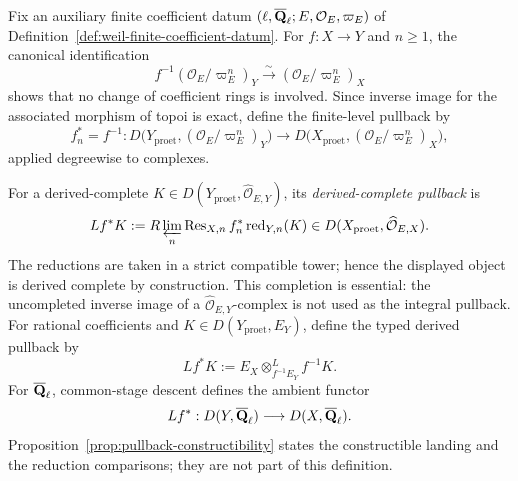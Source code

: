 \begin{definition}
\label{def:derived-pullback}


Fix an auxiliary finite coefficient datum
\((\ell,\overline{\mathbf Q}_\ell;E,\mathcal O_E,\varpi_E)\) of
Definition~\ref{def:weil-finite-coefficient-datum}.
For \(f:X\to Y\) and \(n\geq1\), the canonical identification
\[
 f^{-1}(\mathcal O_E/\varpi_E^n)_Y
 \xrightarrow{\sim}(\mathcal O_E/\varpi_E^n)_X
\]
shows that no change of coefficient rings is involved.  Since inverse image
for the associated morphism of topoi is exact, define the finite-level
pullback by
\[
 f_n^*=f^{-1}:
 D\bigl(Y_{\mathrm{proet}},(\mathcal O_E/\varpi_E^n)_Y\bigr)
 \longrightarrow
 D\bigl(X_{\mathrm{proet}},(\mathcal O_E/\varpi_E^n)_X\bigr),
\]
applied degreewise to complexes.

For a derived-complete
\(K\in D(Y_{\mathrm{proet}},\widehat{\mathcal O}_{E,Y})\), its
\emph{derived-complete pullback} is
\[
 Lf^*K:=R\varprojlim_n\operatorname{Res}_{X,n}
 f_n^*\operatorname{red}_{Y,n}(K)
 \in D(X_{\mathrm{proet}},\widehat{\mathcal O}_{E,X}).
\]
The reductions are taken in a strict compatible tower; hence the displayed
object is derived complete by construction.  This completion is essential:
the uncompleted inverse image of a
\(\widehat{\mathcal O}_{E,Y}\)-complex is not used as the integral
pullback.  For rational coefficients and
\(K\in D(Y_{\mathrm{proet}},E_Y)\), define the typed derived pullback by
\[
 Lf^*K:=E_X\otimes^L_{f^{-1}E_Y}f^{-1}K.
\]
For \(\overline{\mathbf Q}_\ell\), common-stage descent defines the ambient functor
\[
 Lf^*:D(Y,\overline{\mathbf Q}_\ell)\longrightarrow D(X,\overline{\mathbf Q}_\ell).
\]
Proposition~\ref{prop:pullback-constructibility} states
the constructible landing and the reduction comparisons; they are not part
of this definition.
\end{definition}


